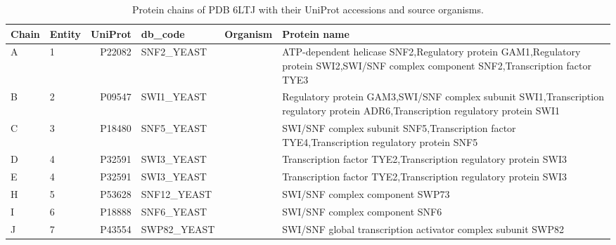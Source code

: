 \begin{table}[htbp]
  \centering\small
  \begin{tabular}{@{}llrllp{6.5cm}@{}}
    \toprule
    Chain & Entity & \multicolumn{1}{c}{UniProt} & db\_code & Organism & Protein name \\
    \midrule
    A & 1 & P22082 & SNF2_YEAST &  & ATP-dependent helicase SNF2,Regulatory protein GAM1,Regulatory protein SWI2,SWI/SNF complex component SNF2,Transcription factor TYE3 \\
    B & 2 & P09547 & SWI1_YEAST &  & Regulatory protein GAM3,SWI/SNF complex subunit SWI1,Transcription regulatory protein ADR6,Transcription regulatory protein SWI1 \\
    C & 3 & P18480 & SNF5_YEAST &  & SWI/SNF complex subunit SNF5,Transcription factor TYE4,Transcription regulatory protein SNF5 \\
    D & 4 & P32591 & SWI3_YEAST &  & Transcription factor TYE2,Transcription regulatory protein SWI3 \\
    E & 4 & P32591 & SWI3_YEAST &  & Transcription factor TYE2,Transcription regulatory protein SWI3 \\
    H & 5 & P53628 & SNF12_YEAST &  & SWI/SNF complex component SWP73 \\
    I & 6 & P18888 & SNF6_YEAST &  & SWI/SNF complex component SNF6 \\
    J & 7 & P43554 & SWP82_YEAST &  & SWI/SNF global transcription activator complex subunit SWP82 \\
    \bottomrule
  \end{tabular}
  \caption{Protein chains of PDB 6LTJ with their UniProt accessions and source organisms.}
  \label{tab:6ltj_chains_uniprot}
\end{table}
